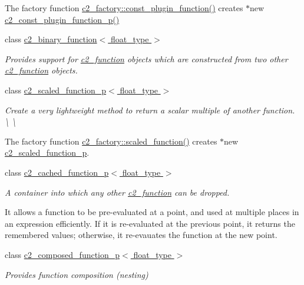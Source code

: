 \begin{DoxyCompactItemize}
\begin{DoxyCompactList}
The factory function \hyperlink{classc2__factory_aebeb20651a347e1fa8f14118faf2588e}{c2\+\_\+factory\+::const\+\_\+plugin\+\_\+function()} creates $\ast$new \hyperlink{classc2__const__plugin__function__p_a443dc7bcbdc6e458673b98aedf53ad56}{c2\+\_\+const\+\_\+plugin\+\_\+function\+\_\+p()} \end{DoxyCompactList}\item 
class \hyperlink{classc2__binary__function}{c2\+\_\+binary\+\_\+function$<$ float\+\_\+type $>$}
\begin{DoxyCompactList}\small\item\em Provides support for \hyperlink{classc2__function}{c2\+\_\+function} objects which are constructed from two other \hyperlink{classc2__function}{c2\+\_\+function} objects. \end{DoxyCompactList}\item 
class \hyperlink{classc2__scaled__function__p}{c2\+\_\+scaled\+\_\+function\+\_\+p$<$ float\+\_\+type $>$}
\begin{DoxyCompactList}\small\item\em Create a very lightweight method to return a scalar multiple of another function. \textbackslash{} \textbackslash{}

The factory function \hyperlink{classc2__factory_a81a7b686b7ffa389ad4dcd8d18997332}{c2\+\_\+factory\+::scaled\+\_\+function()} creates $\ast$new \hyperlink{classc2__scaled__function__p}{c2\+\_\+scaled\+\_\+function\+\_\+p}. \end{DoxyCompactList}\item 
class \hyperlink{classc2__cached__function__p}{c2\+\_\+cached\+\_\+function\+\_\+p$<$ float\+\_\+type $>$}
\begin{DoxyCompactList}\small\item\em A container into which any other \hyperlink{classc2__function}{c2\+\_\+function} can be dropped.

It allows a function to be pre-\/evaluated at a point, and used at multiple places in an expression efficiently. If it is re-\/evaluated at the previous point, it returns the remembered values; otherwise, it re-\/evauates the function at the new point. \end{DoxyCompactList}\item 
class \hyperlink{classc2__composed__function__p}{c2\+\_\+composed\+\_\+function\+\_\+p$<$ float\+\_\+type $>$}
\begin{DoxyCompactList}\small\item\em Provides function composition (nesting)


\end{DoxyCompactList}
\end{DoxyCompactItemize}
